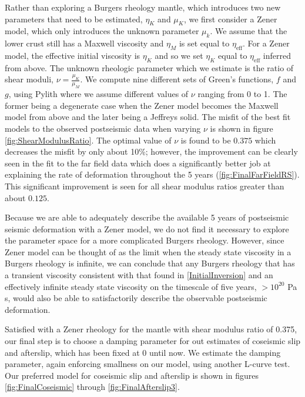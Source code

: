 \documentclass[12pt]{article}
\begin{document}
Rather than exploring a Burgers rheology mantle, which introduces two new parameters that need to be estimated, $\eta_{K}$ and $\mu_{K}$, we first consider a Zener model, which only introduces the unknown parameter $\mu_{k}$.  We assume that the lower crust still has a Maxwell viscosity and $\eta_{M}$ is set equal to $\eta_{\mathrm{eff}}$. For a Zener model, the effective initial viscosity is $\eta_{K}$ and so we set $\eta_K$ equal to $\eta_{\mathrm{eff}}$ inferred from above.  The unknown rheologic parameter which we estimate is the ratio of shear moduli, $\nu=\frac{\mu_K}{\mu_M}$. We compute nine different sets of Green's functions, $f$ and $g$, using Pylith where we assume different values of $\nu$ ranging from 0 to 1. The former being a degenerate case when the Zener model becomes the Maxwell model from above and the later being a Jeffreys solid.  The misfit of the best fit models to the observed postseismic data when varying $\nu$ is shown in figure \ref{fig:ShearModulusRatio}.  The optimal value of $\nu$ is found to be $0.375$ which decreases the misfit by only about 10\%; however, the improvement can be clearly seen in the fit to the far field data which does a significantly better job at explaining the rate of deformation throughout the 5 years (\ref{fig:FinalFarFieldRS}).  This significant improvement is seen for all shear modulus  ratios greater than about $0.125$. 

Because we are able to adequately  describe the available 5 years of postseismic seismic deformation with a Zener model, we do not find it necessary to explore the parameter space for a more complicated Burgers rheology.  However, since Zener model can be thought of as the limit when the steady state viscosity in a Burgers rheology is infinite, we can conclude that any Burgers rheology that has a transient viscosity consistent with that found in \ref{InitialInversion} and an effectively infinite steady state viscosity on the timescale of five years, $>10^{20}$ Pa s, would also be able to satisfactorily describe the observable postseismic deformation.        

Satisfied with a Zener rheology for the mantle with shear modulus ratio of 0.375, our final step is to choose a damping parameter for out estimates of coseismic slip and afterslip, which has been fixed at 0 until now.  We estimate the damping parameter, again enforcing smallness on our model, using another L-curve test.  Our preferred model for coseismic slip and afterslip is shown in figures \ref{fig:FinalCoseismic} through \ref{fig:FinalAfterslip3}.  
\end{document}
